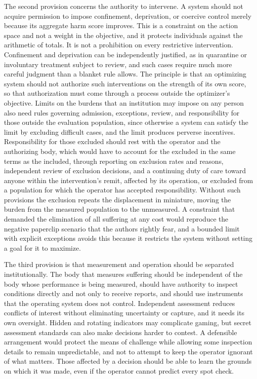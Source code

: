 \documentclass[11pt]{article}
\begin{document}
The second provision concerns the authority to intervene. A system should not acquire permission to impose confinement, deprivation, or coercive control merely because its aggregate harm score improves. This is a constraint on the action space and not a weight in the objective, and it protects individuals against the arithmetic of totals. It is not a prohibition on every restrictive intervention. Confinement and deprivation can be independently justified, as in quarantine or involuntary treatment subject to review, and such cases require much more careful judgment than a blanket rule allows. The principle is that an optimizing system should not authorize such interventions on the strength of its own score, so that authorization must come through a process outside the optimizer's objective. Limits on the burdens that an institution may impose on any person also need rules governing admission, exceptions, review, and responsibility for those outside the evaluation population, since otherwise a system can satisfy the limit by excluding difficult cases, and the limit produces perverse incentives. Responsibility for those excluded should rest with the operator and the authorizing body, which would have to account for the excluded in the same terms as the included, through reporting on exclusion rates and reasons, independent review of exclusion decisions, and a continuing duty of care toward anyone within the intervention's remit, affected by its operation, or excluded from a population for which the operator has accepted responsibility. Without such provisions the exclusion repeats the displacement in miniature, moving the burden from the measured population to the unmeasured. A constraint that demanded the elimination of all suffering at any cost would reproduce the negative paperclip scenario that the authors rightly fear, and a bounded limit with explicit exceptions avoids this because it restricts the system without setting a goal for it to maximize.

The third provision is that measurement and operation should be separated institutionally. The body that measures suffering should be independent of the body whose performance is being measured, should have authority to inspect conditions directly and not only to receive reports, and should use instruments that the operating system does not control. Independent assessment reduces conflicts of interest without eliminating uncertainty or capture, and it needs its own oversight. Hidden and rotating indicators may complicate gaming, but secret assessment standards can also make decisions harder to contest. A defensible arrangement would protect the means of challenge while allowing some inspection details to remain unpredictable, and not to attempt to keep the operator ignorant of what matters. Those affected by a decision should be able to learn the grounds on which it was made, even if the operator cannot predict every spot check.
\end{document}
